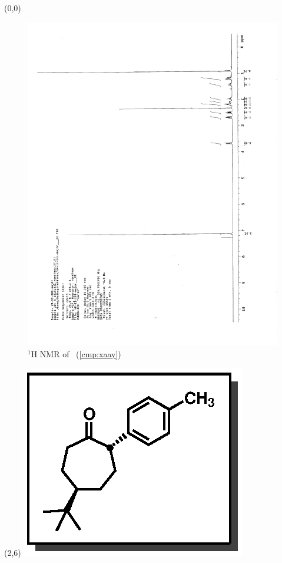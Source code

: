 \begin{textblock}{20}(0,0)
\begin{figure}[htb]
\caption{$^1$H NMR of \CMPxaax\ (\ref{cmp:xaay})}
\includegraphics[scale=0.75, trim = 0mm 0mm 0mm 5mm,
clip]{chp_asymmetric/images/nmr/xaaxH}
\vspace{-100pt}
\end{figure}
\end{textblock}
\begin{textblock}{1}(2,6)
\includegraphics[scale=0.8, angle=90]{chp_asymmetric/images/xaax}
\end{textblock}
